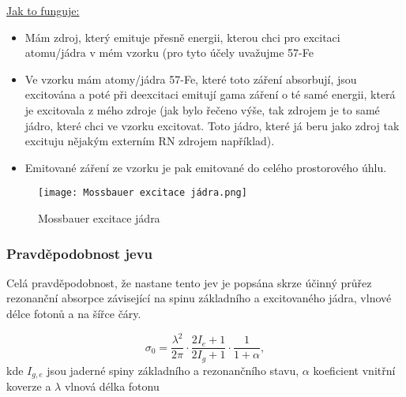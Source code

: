 \underline{Jak to funguje:}

\begin{itemize}
    \item Mám zdroj, který emituje přesně energii, kterou chci pro excitaci atomu/jádra v mém vzorku (pro tyto účely uvažujme 57-Fe

    \item Ve vzorku mám atomy/jádra 57-Fe, které toto záření absorbují, jsou excitována a poté při deexcitaci emitují gama záření o té samé energii, která je excitovala z mého zdroje (jak bylo řečeno výše, tak zdrojem je to samé jádro, které chci ve vzorku excitovat. Toto jádro, které já beru jako zdroj tak excituju nějakým externím RN zdrojem například).

    \item Emitované záření ze vzorku je pak emitované do celého prostorového úhlu.
\end{itemize}

\begin{figure}[ht!]
    \centering
    \texttt{[image: Mossbauer excitace jádra.png]}
    \caption{Mossbauer excitace jádra}
\end{figure}




%
%
%
%

\subsubsection{Pravděpodobnost jevu}

Celá pravděpodobnost, že nastane tento jev je popsána skrze účinný průřez rezonanční absorpce závisející na spinu základního a excitovaného jádra, vlnové délce fotonů a na šířce čáry.


$$\sigma_0 = \dfrac{\lambda^2}{2\pi} \cdot \dfrac{2I_e + 1}{2I_g +1} \cdot \dfrac{1}{1+\alpha},$$
kde $I_{g,e}$ jsou jaderné spiny základního a rezonančního stavu, $\alpha$ koeficient vnitřní koverze a $\lambda$ vlnová délka fotonu
 
